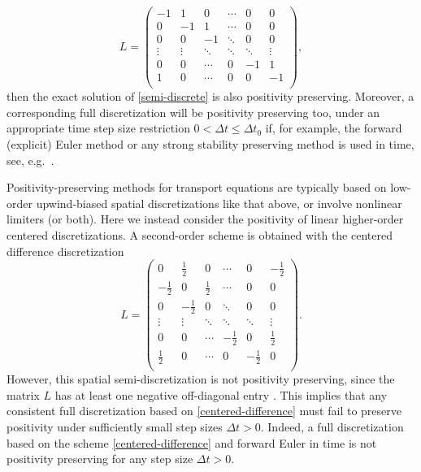 \documentclass[a4paper]{article}
\newcommand{\dt}{\Delta t}
\begin{document}
\begin{equation}\label{upwind1}
L=\left(
\begin{array}{cccccc}
 -1 & 1 & 0  & \cdots & 0 & 0 \\
 0 & -1 & 1 &  \cdots & 0 & 0 \\
 0 & 0 & -1 &  \ddots & 0 & 0\\
 \vdots  & \vdots  & \ddots  & \ddots & \ddots & \vdots \\
  0 & 0 & \cdots  & 0 & -1 & 1 \\
 1 & 0 & \cdots & 0 & 0 & -1 \\
\end{array}
\right),
\end{equation}
then the exact solution of \eqref{semi-discrete} is also positivity
preserving. Moreover, a corresponding full discretization will be positivity preserving too,
under an appropriate time step size restriction $0<\dt\le\dt_0$
if, for example, the forward (explicit) Euler method or any strong stability preserving
method \cite{SSPbook} is used in time, see, e.g.~\cite{posconv}.  

Positivity-preserving methods for transport equations are typically based
on low-order upwind-biased spatial discretizations like that above, or involve
nonlinear limiters (or both).
Here we instead consider the positivity of linear higher-order centered discretizations.
A second-order scheme is obtained with the centered difference discretization
\begin{equation}\label{centered-difference}
L=\left(
\begin{array}{cccccc}
 0 & \frac{1}{2} & 0  & \cdots & 0 & -\frac{1}{2} \\
 -\frac{1}{2} & 0 & \frac{1}{2} &  \cdots & 0 & 0 \\
 0 & -\frac{1}{2} & 0 &  \ddots & 0 & 0\\
 \vdots  & \vdots  & \ddots  & \ddots & \ddots & \vdots \\
  0 & 0 & \cdots  & -\frac{1}{2} & 0 & \frac{1}{2} \\
 \frac{1}{2} & 0 & \cdots & 0 & -\frac{1}{2} & 0 \\
\end{array}
\right).
\end{equation}
However, this spatial semi-discretization is not positivity preserving, since the
matrix $L$ has at least one negative off-diagonal entry \cite[Chapter I,
Theorem 7.2]{hundsdorferverwer}.
This implies that any consistent full discretization based on \eqref{centered-difference}
must fail to preserve positivity under sufficiently small step sizes $\dt>0$.
Indeed, a full discretization based on the scheme \eqref{centered-difference}
and forward Euler in time is not positivity preserving for any step size $\dt>0$.
\end{document}
